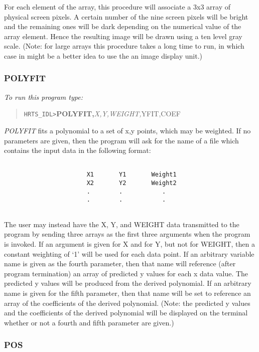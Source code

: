 For each element of the array, this procedure will associate a 3x3 array of
physical screen pixels.  A certain number of the nine screen pixels will be
bright and the remaining ones will be dark depending on the numerical value of
the array element.  Hence the resulting image will be drawn using a ten level
gray scale.  (Note:  for large arrays this procedure takes a long time to run,
in which case in might be a better idea to use the an image  display unit.)

\subsubsection{POLYFIT}

{\em To run this program type:}   
   
\begin{quote}   
    {\tt HRTS\_IDL>}{\bf POLYFIT,}{\it X,Y,WEIGHT,}YFIT,COEF      
\end{quote}   
{\em POLYFIT} fits a polynomial to a set of {x,y} points, which may be
weighted. If no parameters are given, then the program will ask for the name
of a file which contains the input data in the following format:
\begin{verbatim}                  

                       X1       Y1       Weight1 
                       X2       Y2       Weight2 
                       .        .           .    
                       .        .           .    
                    
\end{verbatim}   

The user may instead have the X, Y, and WEIGHT data transmitted to the program
by sending three arrays as the first three arguments when the program is
invoked.  If an argument is given for X and for Y, but not for WEIGHT, then a
constant weighting of `1' will be used for each data point.  If an arbitrary
variable name is given as the fourth parameter, then that name will reference
(after program termination) an array of predicted y values for each x data
value.  The predicted y values will be produced from the derived polynomial. 
If an arbitrary name is given for the fifth parameter, then that name will be
set to reference an array of the coefficients of the derived polynomial. (Note:
the predicted y values and the coefficients of the derived polynomial will be
displayed on the terminal whether or not a fourth and fifth parameter are
given.)

\subsubsection{POS}

